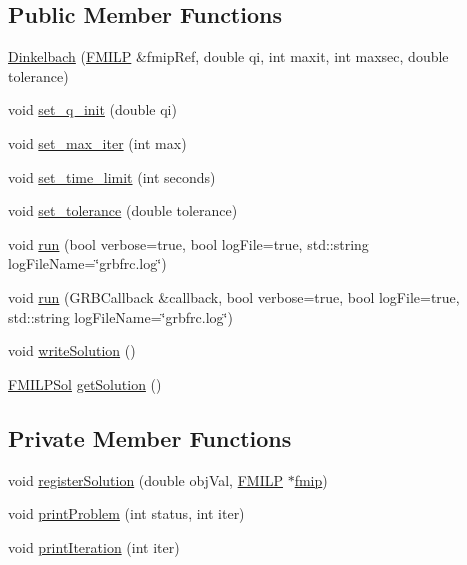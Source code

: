 \subsection*{Public Member Functions}
\begin{DoxyCompactItemize}
\item 
\hyperlink{classgrbfrc_1_1Dinkelbach_a555d9710b9252b64bb7919554f82aac2}{Dinkelbach} (\hyperlink{classgrbfrc_1_1FMILP}{F\+M\+I\+LP} \&fmip\+Ref, double qi, int maxit, int maxsec, double tolerance)
\item 
void \hyperlink{classgrbfrc_1_1Dinkelbach_ac29adf5a73dcdd4d008c4e8b40ea2013}{set\+\_\+q\+\_\+init} (double qi)
\item 
void \hyperlink{classgrbfrc_1_1Dinkelbach_a8b89f06ee090b89eac1f967751d45900}{set\+\_\+max\+\_\+iter} (int max)
\item 
void \hyperlink{classgrbfrc_1_1Dinkelbach_a4be338efdc5fdd17a84b41091d77528f}{set\+\_\+time\+\_\+limit} (int seconds)
\item 
void \hyperlink{classgrbfrc_1_1Dinkelbach_a8f1ea3b5713cbd3d586ecb45027d1a2a}{set\+\_\+tolerance} (double tolerance)
\item 
void \hyperlink{classgrbfrc_1_1Dinkelbach_ab8ac04bd4f79da6c5bba0f0d969942ce}{run} (bool verbose=true, bool log\+File=true, std\+::string log\+File\+Name=\char`\"{}grbfrc.\+log\char`\"{})
\item 
void \hyperlink{classgrbfrc_1_1Dinkelbach_ac43714fb91027f9912205d049650c07e}{run} (G\+R\+B\+Callback \&callback, bool verbose=true, bool log\+File=true, std\+::string log\+File\+Name=\char`\"{}grbfrc.\+log\char`\"{})
\item 
void \hyperlink{classgrbfrc_1_1Dinkelbach_a9a27c81b1b70feeabebb17a65f6ada30}{write\+Solution} ()
\item 
\hyperlink{structgrbfrc_1_1FMILPSol}{F\+M\+I\+L\+P\+Sol} \hyperlink{classgrbfrc_1_1Dinkelbach_a486f5253d9df01c5a2887804aac7383a}{get\+Solution} ()
\end{DoxyCompactItemize}
\subsection*{Private Member Functions}
\begin{DoxyCompactItemize}
\item 
void \hyperlink{classgrbfrc_1_1Dinkelbach_a580fb42838c0e80bd187a36b297d4be6}{register\+Solution} (double obj\+Val, \hyperlink{classgrbfrc_1_1FMILP}{F\+M\+I\+LP} $\ast$\hyperlink{classgrbfrc_1_1Dinkelbach_aa7b46a3cb24f1ec0f278edaa2348729d}{fmip})
\item 
void \hyperlink{classgrbfrc_1_1Dinkelbach_a37136d7a62a3b8b5b480788750fcb5e3}{print\+Problem} (int status, int iter)
\item 
void \hyperlink{classgrbfrc_1_1Dinkelbach_a761608ae16a7e037e2b2e6a0dd096697}{print\+Iteration} (int iter)
\end{DoxyCompactItemize}
